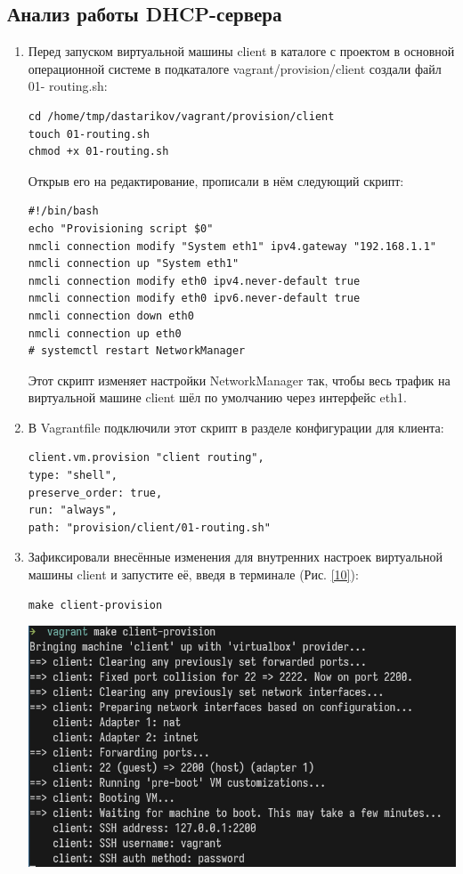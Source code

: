 \subsection{Анализ работы DHCP-сервера}
\begin{enumerate}
\item Перед запуском виртуальной машины client в каталоге с проектом в основной операционной системе в подкаталоге vagrant/provision/client создали файл 01- routing.sh:
    \begin{verbatim}
cd /home/tmp/dastarikov/vagrant/provision/client
touch 01-routing.sh
chmod +x 01-routing.sh
    \end{verbatim}
Открыв его на редактирование, прописали в нём следующий скрипт:
    \begin{verbatim}
#!/bin/bash
echo "Provisioning script $0"
nmcli connection modify "System eth1" ipv4.gateway "192.168.1.1"
nmcli connection up "System eth1"
nmcli connection modify eth0 ipv4.never-default true
nmcli connection modify eth0 ipv6.never-default true
nmcli connection down eth0
nmcli connection up eth0
# systemctl restart NetworkManager
    \end{verbatim}
Этот скрипт изменяет настройки NetworkManager так, чтобы весь трафик на виртуальной машине client шёл по умолчанию через интерфейс eth1.
\item В Vagrantfile подключили этот скрипт в разделе конфигурации для клиента:
    \begin{verbatim}
client.vm.provision "client routing",
type: "shell",
preserve_order: true,
run: "always",
path: "provision/client/01-routing.sh"
    \end{verbatim}
\item Зафиксировали внесённые изменения для внутренних настроек виртуальной машины client и запустите её, введя в терминале (Рис. \ref{10}):
    \begin{verbatim}
make client-provision
    \end{verbatim}

\begin{center}
    \centering
    \includegraphics[width=\textwidth]{../images/image10.png}
    \label{10}
\end{center}


\end{enumerate}
